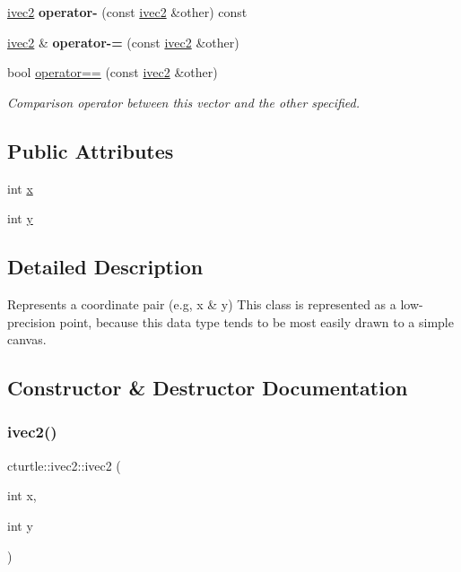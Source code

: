 \begin{DoxyCompactItemize}
\hyperlink{structcturtle_1_1ivec2}{ivec2} {\bfseries operator-\/} (const \hyperlink{structcturtle_1_1ivec2}{ivec2} \&other) const
\item 
\mbox{\label{structcturtle_1_1ivec2_ad2a08be90142c069aa775ab41c8d88cf}} 
\hyperlink{structcturtle_1_1ivec2}{ivec2} \& {\bfseries operator-\/=} (const \hyperlink{structcturtle_1_1ivec2}{ivec2} \&other)
\item 
\mbox{\label{structcturtle_1_1ivec2_ab564fda10817a6e06b80b205f9833dee}} 
bool \hyperlink{structcturtle_1_1ivec2_ab564fda10817a6e06b80b205f9833dee}{operator==} (const \hyperlink{structcturtle_1_1ivec2}{ivec2} \&other)
\begin{DoxyCompactList}\small\item\em Comparison operator between this vector and the other specified. \end{DoxyCompactList}\end{DoxyCompactItemize}
\subsection*{Public Attributes}
\begin{DoxyCompactItemize}
\item 
int \hyperlink{structcturtle_1_1ivec2_acf8e72e8e3847b3a62f35bfbe588b637}{x}
\item 
int \hyperlink{structcturtle_1_1ivec2_a20914f8516f2f9b8e88e81cdf8415897}{y}
\end{DoxyCompactItemize}


\subsection{Detailed Description}
Represents a coordinate pair (e.\+g, x \& y) This class is represented as a low-\/precision point, because this data type tends to be most easily drawn to a simple canvas. 

\subsection{Constructor \& Destructor Documentation}
\mbox{\label{structcturtle_1_1ivec2_a7069d9f7c5ef7505c7c00c55958e0982}} 
\subsubsection{\texorpdfstring{ivec2()}{ivec2()}}
{\footnotesize\ttfamily cturtle\+::ivec2\+::ivec2 (\begin{DoxyParamCaption}\item[{int}]{x,  }\item[{int}]{y }\end{DoxyParamCaption})\hspace{0.3cm}{\ttfamily [inline]}}



